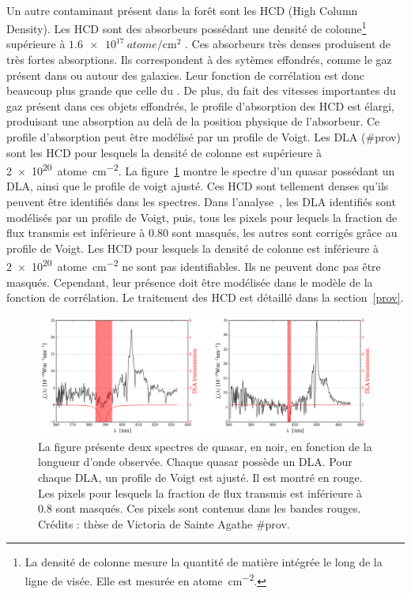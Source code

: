 \documentclass[11pt, twoside, a4paper, openright]{report}
\begin{document}
\paragraph{}
Un autre contaminant présent dans la forêt \lya{} sont les HCD (High Column Density). Les HCD sont des absorbeurs possédant une densité de colonne\footnote{La densité de colonne mesure la quantité de matière intégrée le long de la ligne de visée. Elle est mesurée en \si{atome\per\centi\meter\squared}.} supérieure à $\SI{1.6e17}{atome\per\centi\meter\squared}$ \autocite{Rogers2017}. Ces absorbeurs très denses produisent de très fortes absorptions. Ils correspondent à des sytèmes effondrés, comme le gaz présent dans ou autour des galaxies. Leur fonction de corrélation est donc beaucoup plus grande que celle du \lya{}. De plus, du fait des vitesses importantes du gaz présent dans ces objets effondrés, le profile d'absorption des HCD est élargi, produisant une absorption au delà de la position physique de l'absorbeur. Ce profile d'absorption peut être modélisé par un profile de Voigt.
Les DLA (\#prov) sont les HCD pour lesquels la densité de colonne est supérieure à \SI{2e20}{atome\per\centi\meter\squared}.
La figure~\ref{fig:exemple_dla} montre le spectre d'un quasar possédant un DLA, ainsi que le profile de voigt ajusté.
Ces HCD sont tellement denses qu'ils peuvent être identifiés dans les spectres. Dans l'analyse~\cite{CITE DR16}, les DLA identifiés sont modélisés par un profile de Voigt, puis, tous les pixels pour lequels la fraction de flux transmis est inférieure à \num{0.80} sont masqués, les autres sont corrigés grâce au profile de Voigt.
Les HCD pour lesquels la densité de colonne est inférieure à \SI{2e20}{atome\per\centi\meter\squared} ne sont pas identifiables. Ils ne peuvent donc pas être masqués.
Cependant, leur présence doit être modélisée dans le modèle de la fonction de corrélation.
Le traitement des HCD est détaillé dans la section~\ref{prov}.
\begin{figure}
  \centering
  \includegraphics[scale=0.4]{exemple_dla}
  \caption{La figure présente deux spectres de quasar, en noir, en fonction de la longueur d'onde observée. Chaque quasar possède un DLA. Pour chaque DLA, un profile de Voigt est ajusté. Il est montré en rouge. Les pixels pour lesquels la fraction de flux transmis est inférieure à \num{0.8} sont masqués. Ces pixels sont contenus dans les bandes rouges. Crédits : thèse de Victoria de Sainte Agathe \#prov.}
  \label{fig:exemple_dla}
\end{figure}



% 
\printbibliography
\end{document}
